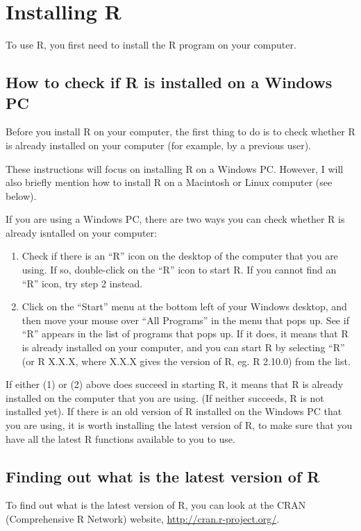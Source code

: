 \documentclass[a4paper,10pt,english]{sphinxmanual}
\begin{document}
\section{Installing R}
\label{src/installr:installing-r}
To use R, you first need to install the R program on your computer.


\subsection{How to check if R is installed on a Windows PC}
\label{src/installr:how-to-check-if-r-is-installed-on-a-windows-pc}
Before you install R on your computer, the first thing to do is to check whether
R is already installed on your computer (for example, by a previous user).

These instructions will focus on installing R on a Windows PC. However, I will also
briefly mention how to install R on a Macintosh or Linux computer (see below).

If you are using a Windows PC, there are two ways you can check whether R is
already isntalled on your computer:
\begin{enumerate}
\item {} 
Check if there is an ``R'' icon on the desktop of the computer that you are using.
If so, double-click on the ``R'' icon to start R. If you cannot find an ``R'' icon, try step 2 instead.

\item {} 
Click on the ``Start'' menu at the bottom left of your Windows desktop, and then move your
mouse over ``All Programs'' in the menu that pops up. See if ``R'' appears in the list
of programs that pops up. If it does, it means that R is already installed on your
computer, and you can start R by selecting ``R''  (or R X.X.X, where X.X.X gives the version of R,
eg. R 2.10.0) from the list.

\end{enumerate}

If either (1) or (2) above does succeed in starting R, it means that R is already installed
on the computer that you are using. (If neither succeeds, R is not installed yet).
If there is an old version of R installed on the Windows PC that you are using,
it is worth installing the latest version of R, to make sure that you have all the
latest R functions available to you to use.


\subsection{Finding out what is the latest version of R}
\label{src/installr:finding-out-what-is-the-latest-version-of-r}
To find out what is the latest version of R, you can look at the CRAN (Comprehensive
R Network) website, \href{http://cran.r-project.org/}{http://cran.r-project.org/}.
\end{document}
